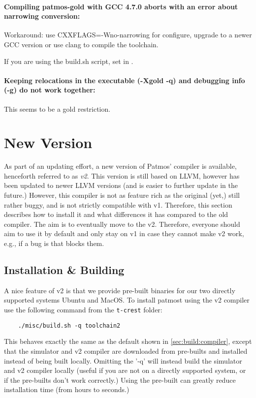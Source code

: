 \paragraph{Compiling patmos-gold with GCC 4.7.0 aborts with an error about narrowing conversion:}
Workaround: use CXXFLAGS=-Wno-narrowing for configure, upgrade to a newer GCC version or
use clang to compile the toolchain.

If you are using the build.sh script, set  in .


\paragraph{Keeping relocations in the executable (-Xgold -q) and debugging info (-g) do not work together:}
This seems to be a gold restriction.

\section{New Version}

As part of an updating effort, a new version of Patmos' compiler is available, henceforth referred to as \textit{v2}.
This version is still based on LLVM, however has been updated to newer LLVM versions (and is easier to further update in the future.)
However, this compiler is not as feature rich as the original (yet,) still rather buggy, and is not strictly compatible with v1.
Therefore, this section describes how to install it and what differences it has compared to the old compiler.
The aim is to eventually move to the v2.
Therefore, everyone should aim to use it by default and only stay on v1 in case they cannot make v2 work, e.g., if a bug is that blocks them.

\subsection{Installation \& Building}

A nice feature of v2 is that we provide pre-built binaries for our two directly supported systems Ubuntu and MacOS.
To install patmost using the v2 compiler use the following command from the \texttt{t-crest} folder:

\begin{verbatim}
	./misc/build.sh -q toolchain2
\end{verbatim}

This behaves exactly the same as the default shown in \autoref{sec:build:compiler}, except that the simulator and v2 compiler are downloaded from pre-builts and installed instead of being built locally.
Omitting the '-q' will instead build the simulator and v2 compiler locally (useful if you are not on a directly supported system, or if the pre-builts don't work correctly.)
Using the pre-built can greatly reduce installation time (from hours to seconds.)

